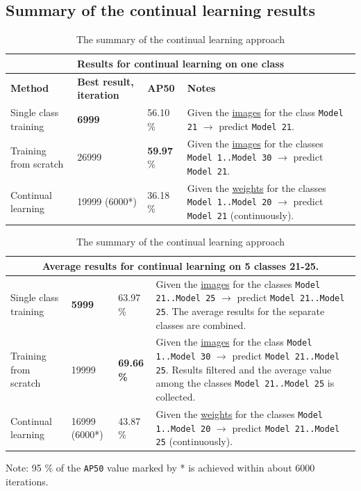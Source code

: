 \documentclass[english, 12pt, a4paper, elec, utf8, a-1b, online]{aaltothesis}
\begin{document}
\subsection{Summary of the continual learning results}

\begin{table}
\centering
\caption{The summary of the continual learning approach}
\begin{tabularx}{\textwidth}{|p{1.5cm}|p{1.5cm}|p{1.5cm}|X|} 
 \hline
\multicolumn{4}{c}{\textbf{Results for continual learning on one class}} \\ \hline
\textbf{Method} & \textbf{Best result, iteration} & \textbf{AP50} & \textbf{Notes} \\
\hline
Single class training & \textbf{6999} & 56.10 \% & \multicolumn{1}{m{9cm}|}{Given the \uline{images} for the class \texttt{Model 21} $\rightarrow$ predict \texttt{Model 21}.} \\ 
\hline
Training from scratch  & 26999 & \textbf{59.97} \% & \multicolumn{1}{m{9cm}|}{Given the \uline{images} for the classes \texttt{Model 1..Model 30} $\rightarrow$ predict \texttt{Model 21}.} \\ 
\hline
Continual learning & 19999 (6000*) & 36.18 \% & \multicolumn{1}{m{9cm}|}{Given the \uline{weights} for the classes  \texttt{Model 1..Model 20} $\rightarrow$ predict \texttt{Model 21} (continuously).} \\ 
\hline  
\end{tabularx} 
\begin{tabularx}{\textwidth}{|p{1.5cm}|p{1.5cm}|p{1.5cm}|X|} 
\multicolumn{4}{c}{\textbf{Average results for continual learning on 5 classes 21-25}.} \\ 
\hline
Single class training  & \textbf{5999} & 63.97 \% & \multicolumn{1}{m{9cm}|}{Given the \uline{images} for the classes \texttt{Model 21..Model 25} $\rightarrow$ predict \texttt{Model 21..Model 25}. The average results for the  separate classes are combined.} \\ 
\hline
Training from scratch & 19999 & \textbf{69.66 \%} & \multicolumn{1}{m{9cm}|}{Given the \uline{images} for the class \texttt{Model 1..Model 30} $\rightarrow$ predict \texttt{Model 21..Model 25}. Results filtered and the average value among the classes \texttt{Model 21..Model 25} is collected.} \\ 
\hline
Continual learning & 16999 (6000*) & 43.87 \% & \multicolumn{1}{m{9cm}|}{Given the \uline{weights} for the classes \texttt{Model 1..Model 20} $\rightarrow$ predict \texttt{Model 21..Model 25} (continuously). } \\ 
\hline      
\end{tabularx}
\begin{tablenotes}
\small
\item Note: 95 \% of the \texttt{AP50} value marked by * is achieved within about 6000 iterations.
\end{tablenotes}
\end{table}
\FloatBarrier 
\end{document}
